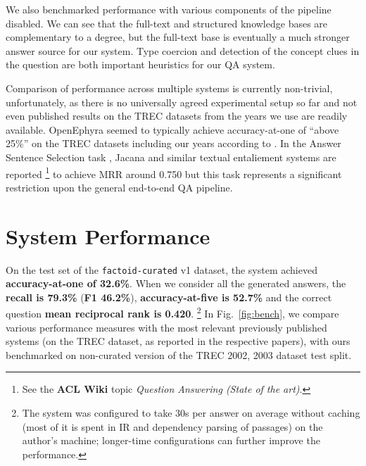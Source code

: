 We also benchmarked performance with various components of the pipeline
disabled.  We can see that the full-text and structured knowledge bases
are complementary to a degree, but the full-text base is eventually
a much stronger answer source for our system.  Type coercion and detection
of the concept clues in the question are both important heuristics for
our QA system.

Comparison of performance across multiple systems is currently non-trivial,
unfortunately, as there is no universally agreed experimental setup so far
and not even published results on the TREC datasets
from the years we use are readily available.
OpenEphyra seemed to typically achieve accuracy-at-one of ``above 25\%'' on
the TREC datasets including our years according to \citep{Ephyra2006}.
In the Answer Sentence Selection task \citep{WangQAGrammar},
Jacana and similar textual entaliement systems are reported%
\footnote{See the \textbf{ACL Wiki} topic \textit{Question Answering (State of the art)}.}
to achieve MRR around 0.750 but this task represents
a significant restriction upon the general end-to-end QA pipeline.

\section{System Performance}

On the test set of the \texttt{factoid-curated} v1 dataset,
the system achieved \textbf{accura\-cy-at-one of 32.6\%}.
	When we consider all the generated answers,
	the \textbf{recall is 79.3\%} (\textbf{F1 46.2\%}),
	\textbf{accuracy-at-five is 52.7\%}
	and the correct question \textbf{mean reciprocal rank is 0.420}.%
\footnote{The system was configured to take 30s per answer
on average without caching (most of it is spent in IR and dependency parsing of passages)
on the author's machine; longer-time configurations can further improve the performance.}
In Fig.~\ref{fig:bench}, we compare various performance measures
with the most relevant previously published systems
(on the TREC dataset, as reported in the respective papers),
with ours benchmarked on non-curated version of the TREC 2002, 2003 dataset test split.

